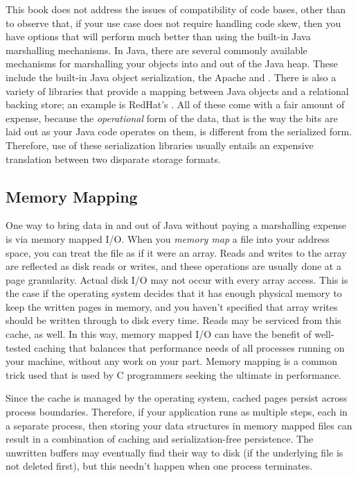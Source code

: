 This book does not address the issues of compatibility of code bases, other than
to observe that, if your use case does not require handling code skew, then you
have options that will perform much better than using the built-in Java
marshalling mechanisms. In Java, there are several commonly available mechanisms
for marshalling your objects into and out of the Java heap. These include the
built-in Java object serialization, the Apache  and
. There is also a variety of libraries that provide a
mapping between Java objects and a relational backing store; an example is
RedHat's . All of these come with a fair amount of expense,
because the \emph{operational} form of the data, that is the way the bits are
laid out as your Java code operates on them, is different from the serialized
form. Therefore, use of these serialization libraries usually entails an
expensive translation between two disparate storage formats.


\subsection{Memory Mapping}

One way to bring data in and out of Java without paying a marshalling expense
is via memory mapped I/O. When you \emph{memory map} a file into your address
space, you can treat the file as if it were an array. Reads and writes to the
array are reflected as disk reads or writes, and these operations are usually
done at a page granularity. Actual disk I/O may not occur with every array
access. This is the case if the operating system decides that it has enough
physical memory to keep the written pages in memory, and you haven't specified
that array writes should be written through to disk every time. Reads may be
serviced from this cache, as well. In this way, memory mapped I/O can have the
benefit of well-tested caching that balances that performance needs of all
processes running on your machine, without any work on your part.  Memory mapping
is a common trick used that is used by C programmers seeking the ultimate in
performance.

Since the cache is managed by the operating system, cached pages persist across
process boundaries. Therefore, if your application runs as multiple steps, each
in a separate process, then storing your data structures in memory mapped files
can result in a combination of caching and serialization-free persistence. The
unwritten buffers may eventually find their way to disk (if the underlying file
is not deleted first), but this needn't happen when one process terminates.

